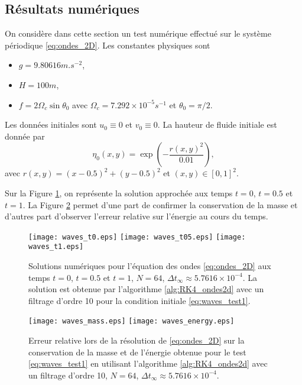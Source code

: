 \subsection{Résultats numériques}

On considère dans cette section un test numérique effectué sur le système périodique \eqref{eq:ondes_2D}. Les constantes physiques sont
\begin{itemize}
\item $g = 9.80616 \si{m.s^{-2}}$,
\item $H=100 \si{m}$,
\item $f = 2 \Omega_c \sin \theta_0$ avec $\Omega_c = 7.292 \times 10^{-5} \si{s^{-1}}$ et $\theta_0 = \pi/2$.
\end{itemize}
Les données initiales sont $u_0 \equiv 0$ et $v_0 \equiv 0$. La hauteur de fluide initiale est donnée par
\begin{equation}
\eta_0(x,y) = \exp \left( - \dfrac{r(x,y)^2}{0.01} \right),
\label{eq:waves_test1}
\end{equation}
avec $r(x,y) = (x-0.5)^2+(y-0.5)^2$ et $(x,y) \in [0,1]^2$.

Sur la Figure \ref{fig:waves_solution}, on représente la solution approchée aux temps $t=0$, $t=0.5$ et $t=1$. La Figure \ref{fig:waves_conservation} permet d'une part de confirmer la conservation de la masse et d'autres part d'observer l'erreur relative sur l'énergie au cours du temps.
\begin{figure}[htbp]
\begin{center}
\texttt{[image: waves\_t0.eps]}
\texttt{[image: waves\_t05.eps]}
\texttt{[image: waves\_t1.eps]}
\end{center}
\caption{Solutions numériques pour l'équation des ondes \eqref{eq:ondes_2D} aux temps $t=0$, $t=0.5$ et $t=1$, $N=64$, $\Delta t_{\infty} \approx 5.7616\times10^{-4}$. La solution est obtenue par l'algorithme \ref{alg:RK4_ondes2d} avec un filtrage d'ordre 10 pour la condition initiale \eqref{eq:waves_test1}.}
\label{fig:waves_solution}
\end{figure}
\begin{figure}[htbp]
\begin{center}
\texttt{[image: waves\_mass.eps]}
\texttt{[image: waves\_energy.eps]}
\end{center}
\caption{Erreur relative lors de la résolution de \eqref{eq:ondes_2D} sur la conservation de la masse et de l'énergie obtenue pour le test \eqref{eq:waves_test1} en utilisant l'algorithme \ref{alg:RK4_ondes2d} avec un filtrage d'ordre 10, $N=64$, $\Delta t_{\infty} \approx 5.7616\times10^{-4}$.}
\label{fig:waves_conservation}
\end{figure}

